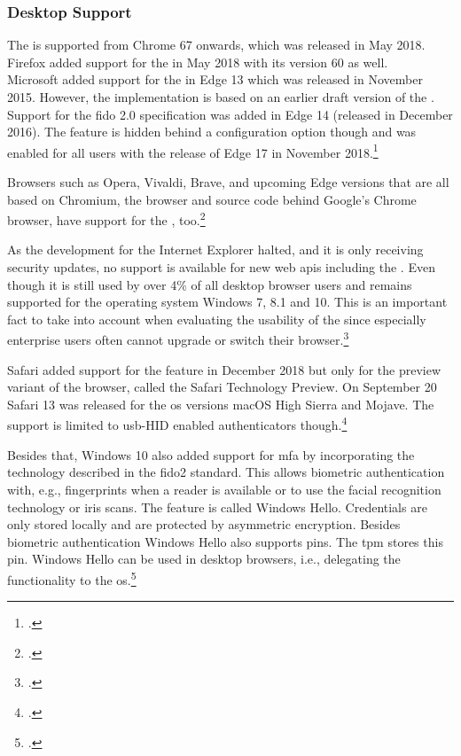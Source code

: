 \subsubsection{Desktop Support}

The \wa{} is supported from Chrome 67 onwards, which was released in May 2018. Firefox added support for the \wa{} in May 2018 with its version 60 as well.\\
Microsoft added support for the \wa{} in Edge 13 which was released in November 2015. However, the implementation is based on an earlier draft version of the \wa. Support for the \gls{fido} 2.0 specification was added in Edge 14 (released in December 2016). The feature is hidden behind a configuration option though and was enabled for all users with the release of Edge 17 in November 2018.\footcite[See][112]{Jacobs:2019}

Browsers such as Opera, Vivaldi, Brave, and upcoming Edge versions that are all based on Chromium, the browser and source code behind Google's Chrome browser, have support for the \wa, too.\footcites[See][Chapter 7.1]{kissell2019take}

As the development for the Internet Explorer halted, and it is only receiving security updates, no support is available for new web \glspl{api} including the \wa. Even though it is still used by over 4\% of all desktop browser users and remains supported for the operating system Windows 7, 8.1 and 10. This is an important fact to take into account when evaluating the usability of the \wa{} since especially enterprise users often cannot upgrade or switch their browser.\footcites[See][]{ie-support}[See][]{statcounter-desktop}

Safari added support for the \wa{} feature in December 2018 but only for the preview variant of the browser, called the Safari Technology Preview. On September 20 Safari 13 was released for the \gls{os} versions macOS High Sierra and Mojave. The support is limited to \gls{usb}-HID enabled authenticators though.\footcites[See][]{safari-webauthn}[See][]{safari-13-release}

Besides that, Windows 10 also added support for \gls{mfa} by incorporating the technology described in the \gls{fido}2 standard. This allows biometric authentication with, e.g., fingerprints when a reader is available or to use the facial recognition technology or iris scans. The feature is called \frqq Windows Hello\flqq{}. Credentials are only stored locally and are protected by asymmetric encryption. Besides biometric authentication Windows Hello also supports \glspl{pin}. The \gls{tpm} stores this \gls{pin}. Windows Hello can be used in desktop browsers, i.e., delegating the \wa{} functionality to the \gls{os}.\footcites[See][]{201612}[See][6]{fido-whitepaper-amd}

